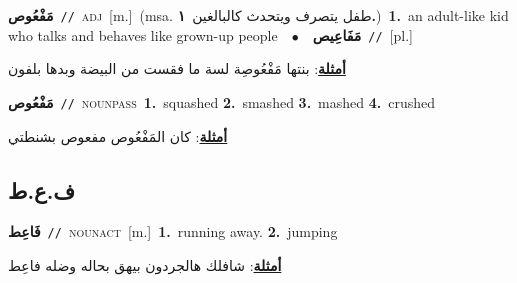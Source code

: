 \documentclass[10pt,a4paper,twoside]{article} %
\begin{document}
\begin{multicols}{2}
{\setlength\topsep{0pt}\textbf{\foreignlanguage{arabic}{مَفْعُوص}}\ {\color{gray}\texttt{//}\color{black}}\ \textsc{adj}\ [m.]\ \color{gray}(msa. \foreignlanguage{arabic}{طفل يتصرف ويتحدث كالبالغين}~\foreignlanguage{arabic}{\textbf{١.}})\color{black}\ \textbf{1.}~an adult-like kid who talks and behaves like grown-up people\ \ $\bullet$\ \ \setlength\topsep{0pt}\textbf{\foreignlanguage{arabic}{مَفَاعِيص}}\ {\color{gray}\texttt{//}\color{black}}\ [pl.]\  \begin{flushright}\color{gray}\foreignlanguage{arabic}{\textbf{\underline{\foreignlanguage{arabic}{أمثلة}}}: بنتها مَفْعُوصِة لسة ما فقست من البيضة وبدها بلفون}\end{flushright}\color{black}} \vspace{2mm}

{\setlength\topsep{0pt}\textbf{\foreignlanguage{arabic}{مَفْعُوص}}\ {\color{gray}\texttt{//}\color{black}}\ \textsc{noun\textunderscore pass}\ \textbf{1.}~squashed  \textbf{2.}~smashed  \textbf{3.}~mashed  \textbf{4.}~crushed\  \begin{flushright}\color{gray}\foreignlanguage{arabic}{\textbf{\underline{\foreignlanguage{arabic}{أمثلة}}}: كان المَفْعُوص مفعوص بشنطتي}\end{flushright}\color{black}} \vspace{2mm}

\vspace{-3mm}
\subsection*{\color{blue}\foreignlanguage{arabic}{ف.ع.ط}\color{blue}{}} 

{\setlength\topsep{0pt}\textbf{\foreignlanguage{arabic}{فَاعِط}}\ {\color{gray}\texttt{//}\color{black}}\ \textsc{noun\textunderscore act}\ [m.]\ \textbf{1.}~running away.  \textbf{2.}~jumping\  \begin{flushright}\color{gray}\foreignlanguage{arabic}{\textbf{\underline{\foreignlanguage{arabic}{أمثلة}}}: شافلك هالجردون بيهق بحاله وضله فاعِط}\end{flushright}\color{black}} \vspace{2mm}


\end{multicols}
\end{document}

